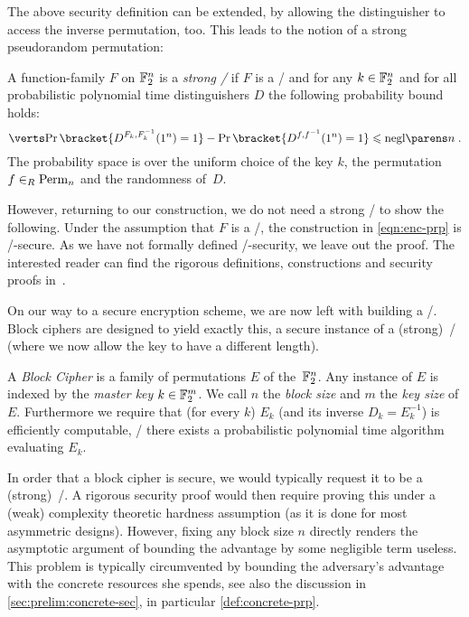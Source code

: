 The above security definition can be extended, by allowing the distinguisher to access the inverse permutation, too.
This leads to the notion of a strong pseudorandom permutation:
\begin{definition}\label{def:strong-prp}
    A function-family $F$ on $\mathbb{F}_2^n$ is a \emph{strong \PRPl/} if $F$ is a \PRP/ and for any $k \in \mathbb{F}_2^n$ and for all probabilistic polynomial time distinguishers $D$ the following probability bound holds:
    \begin{equation*}
        \abs{\Prob\bracket{D^{F_k,F_k^{-1}}(1^n) = 1} - \Prob\bracket{D^{f,f^{-1}}(1^n) = 1}} \leqslant \negl{n}\;.
    \end{equation*}
    The probability space is over the uniform choice of the key $k$, the permutation $f \in_R \perm/_n$ and the randomness of~$D$.
\end{definition}

However, returning to our construction, we do not need a strong \PRP/ to show the following.
Under the assumption that $F$ is a \PRP/, the construction in \cref{eqn:enc-prp} is \CPA/-secure.
As we have not formally defined \CPA/-security, we leave out the proof.
The interested reader can find the rigorous definitions, constructions and security proofs in~\cite{katzlindell}.

On our way to a secure encryption scheme, we are now left with building a \PRP/.
Block ciphers are designed to yield exactly this, a secure instance of a (strong)~\PRP/ (where we now allow the key to have a different length).
\begin{definition}\label{def:bc}
    A \emph{Block Cipher} is a family of permutations $E$ of the~$\mathbb{F}_2^n$.
    Any instance of $E$ is indexed by the \emph{master key} $k \in \mathbb{F}_2^m$.
    We call $n$ the \emph{block size} and $m$ the \emph{key size} of $E$.
    Furthermore we require that (for every $k$) $E_k$ (and its inverse $D_k = E_k^{-1}$) is efficiently computable, \ie/ there exists a probabilistic polynomial time algorithm evaluating $E_k$.
\end{definition}
In order that a block cipher is secure, we would typically request it to be a (strong)~\PRP/.
A rigorous security proof would then require proving this under a (weak) complexity theoretic hardness assumption (as it is done for most asymmetric designs).
However, fixing any block size $n$ directly renders the asymptotic argument of bounding the advantage by some negligible term useless.
This problem is typically circumvented by bounding the adversary's advantage with the concrete resources she spends, see also the discussion in \cref{sec:prelim:concrete-sec}, in particular \cref{def:concrete-prp}.

